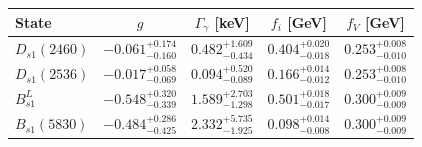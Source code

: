 \begin{tabular}{lcccc}
\toprule
State & $g$ & $\Gamma_\gamma$ [keV] & $f_i$ [GeV] & $f_V$ [GeV]\\
\midrule
$D_{s1}(2460)$ & $-0.061_{-0.160}^{+0.174}$ & $0.482_{-0.434}^{+1.609}$ & $0.404_{-0.018}^{+0.020}$ & $0.253_{-0.010}^{+0.008}$ \\
$D_{s1}(2536)$ & $-0.017_{-0.069}^{+0.058}$ & $0.094_{-0.089}^{+0.520}$ & $0.166_{-0.012}^{+0.014}$ & $0.253_{-0.010}^{+0.008}$ \\
$B_{s1}^{L}$ & $-0.548_{-0.339}^{+0.320}$ & $1.589_{-1.298}^{+2.703}$ & $0.501_{-0.017}^{+0.018}$ & $0.300_{-0.009}^{+0.009}$ \\
$B_{s1}(5830)$ & $-0.484_{-0.425}^{+0.286}$ & $2.332_{-1.925}^{+5.735}$ & $0.098_{-0.008}^{+0.014}$ & $0.300_{-0.009}^{+0.009}$ \\
\bottomrule
\end{tabular}
